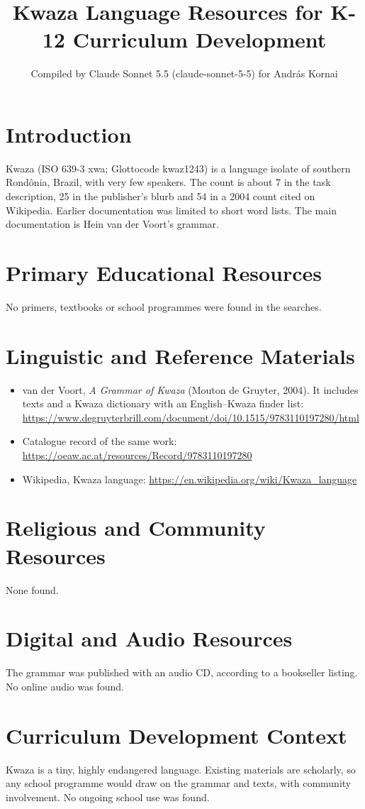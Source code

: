 \documentclass[12pt]{article}
\title{Kwaza Language Resources for K-12 Curriculum Development}
\author{Compiled by Claude Sonnet 5.5 (claude-sonnet-5-5) for Andr\'as Kornai}
\date{}
\begin{document}
\maketitle

\section{Introduction}
Kwaza (ISO 639-3 xwa; Glottocode kwaz1243) is a language isolate of southern Rond\^onia, Brazil, with very few speakers. The count is about 7 in the task description, 25 in the publisher's blurb and 54 in a 2004 count cited on Wikipedia. Earlier documentation was limited to short word lists. The main documentation is Hein van der Voort's grammar.

\section{Primary Educational Resources}
No primers, textbooks or school programmes were found in the searches.

\section{Linguistic and Reference Materials}
\begin{itemize}
\item van der Voort, \emph{A Grammar of Kwaza} (Mouton de Gruyter, 2004). It includes texts and a Kwaza dictionary with an English--Kwaza finder list: \url{https://www.degruyterbrill.com/document/doi/10.1515/9783110197280/html}
\item Catalogue record of the same work: \url{https://oeaw.ac.at/resources/Record/9783110197280}
\item Wikipedia, Kwaza language: \url{https://en.wikipedia.org/wiki/Kwaza_language}
\end{itemize}

\section{Religious and Community Resources}
None found.

\section{Digital and Audio Resources}
The grammar was published with an audio CD, according to a bookseller listing. No online audio was found.

\section{Curriculum Development Context}
Kwaza is a tiny, highly endangered language. Existing materials are scholarly, so any school programme would draw on the grammar and texts, with community involvement. No ongoing school use was found.
\end{document}
